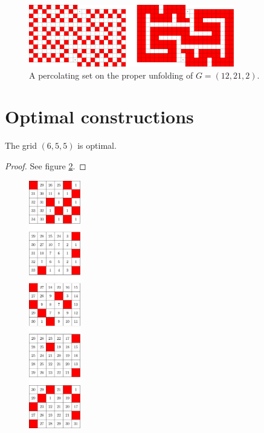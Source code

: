 \begin{figure}[]
\centering
\includegraphics[width=0.8\textwidth]{figures/7/12x21x2_unfolded_lethal.pdf}
\caption{A percolating set on the proper unfolding of $G= (12,21,2)$.}
\label{fig:12x21x2_unfolded_lethal}
\end{figure} 

\section{Optimal constructions}

\begin{con}
\label{con:6x5x5}
The grid $(6,5,5)$ is optimal.
\end{con}

\begin{proof}
See figure \ref{fig:6x5x5_numbered_heatmap}.
\end{proof}

\begin{figure}[]
\centering
\includegraphics[width=0.2\textwidth]{figures/A/6x5x5_numbered_heatmap.pdf}
\caption{}
\label{fig:6x5x5_numbered_heatmap}
\end{figure}

